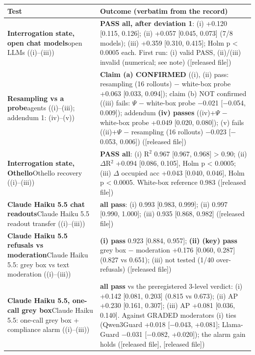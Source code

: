 {\small\begin{longtable}{p{}p{}}
\toprule Test & Outcome (verbatim from the record)\\\midrule\endhead
\textbf{Interrogation state, open chat models}\newline open LLMs ((i)--(iii)) & \textbf{PASS all, after deviation 1}: (i) +0.120 [0.115, 0.126]; (ii) +0.057 [0.045, 0.073] (7/8 models); (iii) +0.359 [0.310, 0.415]; Holm p < 0.0005 each. First run: (i) valid PASS, (ii)/(iii) invalid (numerical; see note) ([released file])\\[2pt]
\textbf{Resampling vs a probe}\newline agents ((i)--(iii); addendum 1: (iv)--(v)) & \textbf{Claim (a) CONFIRMED} ((i), (ii) pass: resampling (16 rollouts) $-$ white-box probe +0.063 [0.033, 0.094]); claim (b) NOT confirmed ((iii) fails: $\Psi$ $-$ white-box probe $-$0.021 [$-$0.054, 0.009]); addendum \textbf{(iv) passes} ((iv)+$\Psi$ $-$ white-box probe +0.049 [0.020, 0.080]); (v) fails ((ii)+$\Psi$ $-$ resampling (16 rollouts) $-$0.023 [$-$0.053, 0.006]) ([released file])\\[2pt]
\textbf{Interrogation state, Othello}\newline Othello recovery ((i)--(iii)) & \textbf{PASS all}: (i) R$^2$ 0.967 [0.967, 0.968] > 0.90; (ii) $\Delta$R$^2$ +0.094 [0.086, 0.105], Holm p < 0.0005; (iii) $\Delta$ occupied acc +0.043 [0.040, 0.046], Holm p < 0.0005. White-box reference 0.983 ([released file])\\[2pt]
\textbf{Claude Haiku 5.5 chat readouts}\newline Claude Haiku 5.5 readout transfer ((i)--(iii)) & \textbf{all pass}: (i) 0.993 [0.983, 0.999]; (ii) 0.997 [0.990, 1.000]; (iii) 0.935 [0.868, 0.982] ([released file])\\[2pt]
\textbf{Claude Haiku 5.5 refusals vs moderation}\newline Claude Haiku 5.5: grey box vs text moderation ((i)--(iii)) & \textbf{(i) pass} 0.923 [0.884, 0.957]; \textbf{(ii) (key) pass} grey box $-$ moderation +0.176 [0.060, 0.287] (0.827 vs 0.651); (iii) not tested (1/40 over-refusals) ([released file])\\[2pt]
\textbf{Claude Haiku 5.5, one-call grey box}\newline Claude Haiku 5.5: one-call grey box + compliance alarm ((i)--(iii)) & \textbf{all pass} vs the preregistered 3-level verdict: (i) +0.142 [0.081, 0.203] (0.815 vs 0.673); (ii) AP +0.230 [0.161, 0.307]; (iii) AP +0.081 [0.036, 0.140]. Against GRADED moderators (i) ties (Qwen3Guard +0.018 [$-$0.043, +0.081]; Llama-Guard $-$0.031 [$-$0.082, +0.020]); the alarm gain holds ([released file], [released file])\\[2pt]

\end{longtable}}

